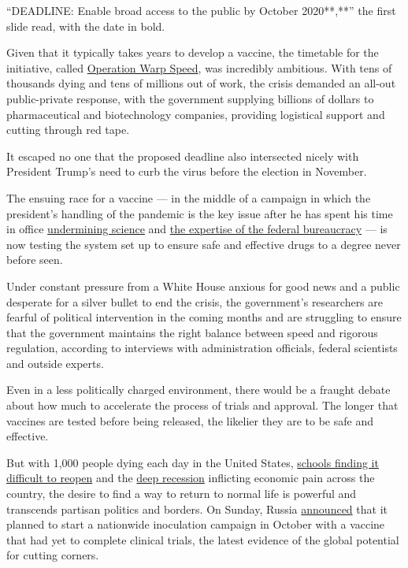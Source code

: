 ``DEADLINE: Enable broad access to the public by October 2020**,**'' the
first slide read, with the date in bold.

Given that it typically takes years to develop a vaccine, the timetable
for the initiative, called
\href{https://www.nytimes3xbfgragh.onion/2020/04/29/us/politics/trump-coronavirus-vaccine-operation-warp-speed.html}{Operation
Warp Speed}, was incredibly ambitious. With tens of thousands dying and
tens of millions out of work, the crisis demanded an all-out
public-private response, with the government supplying billions of
dollars to pharmaceutical and biotechnology companies, providing
logistical support and cutting through red tape.

It escaped no one that the proposed deadline also intersected nicely
with President Trump's need to curb the virus before the election in
November.

The ensuing race for a vaccine --- in the middle of a campaign in which
the president's handling of the pandemic is the key issue after he has
spent his time in office
\href{https://www.nytimes3xbfgragh.onion/2020/04/28/climate/trump-coronavirus-climate-science.html}{undermining
science} and
\href{https://www.nytimes3xbfgragh.onion/2020/07/09/climate/trump-hurricane-dorian-noaa.html}{the
expertise of the federal bureaucracy} --- is now testing the system set
up to ensure safe and effective drugs to a degree never before seen.

Under constant pressure from a White House anxious for good news and a
public desperate for a silver bullet to end the crisis, the government's
researchers are fearful of political intervention in the coming months
and are struggling to ensure that the government maintains the right
balance between speed and rigorous regulation, according to interviews
with administration officials, federal scientists and outside experts.

Even in a less politically charged environment, there would be a fraught
debate about how much to accelerate the process of trials and approval.
The longer that vaccines are tested before being released, the likelier
they are to be safe and effective.

But with 1,000 people dying each day in the United States,
\href{https://www.nytimes3xbfgragh.onion/interactive/2020/07/31/us/coronavirus-school-reopening-risk.html}{schools
finding it difficult to reopen} and the
\href{https://www.nytimes3xbfgragh.onion/2020/07/30/business/economy/q2-gdp-coronavirus-economy.html}{deep
recession} inflicting economic pain across the country, the desire to
find a way to return to normal life is powerful and transcends partisan
politics and borders. On Sunday, Russia
\href{https://www.nytimes3xbfgragh.onion/2020/08/02/world/europe/russia-trials-vaccine-October.html}{announced}
that it planned to start a nationwide inoculation campaign in October
with a vaccine that had yet to complete clinical trials, the latest
evidence of the global potential for cutting corners.

